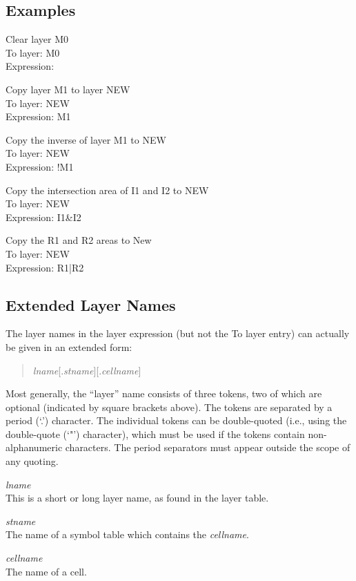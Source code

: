\subsection{Examples}

\begin{description}
\item{Clear layer {\vt M0}}\\
{\cb To layer}: {\vt M0}\\
{\cb Expression}: {}
\item{Copy layer {\vt M1} to layer {\vt NEW}}\\
{\cb To layer}: {\vt NEW}\\
{\cb Expression}: {\vt M1}
\item{Copy the inverse of layer {\vt M1} to {\vt NEW}}\\
{\cb To layer}: {\vt NEW}\\
{\cb Expression}: {\vt !M1}
\item{Copy the intersection area of {\vt I1} and {\vt I2} to {\vt NEW}}\\
{\cb To layer}: {\vt NEW}\\
{\cb Expression}: {\vt I1\&I2}
\item{Copy the {\vt R1} and {\vt R2} areas to {\vt New}}\\
{\cb To layer}: {\vt NEW}\\
{\cb Expression}: {\vt R1|R2}
\end{description}

\subsection{Extended Layer Names}

The layer names in the layer expression (but not the {\cb To layer}
entry) can actually be given in an extended form:

\begin{quote}
{\it lname\/}[{\vt .}{\it stname\/}][{\vt .}{\it cellname\/}]
\end{quote}

Most generally, the ``layer'' name consists of three tokens, two of
which are optional (indicated by square brackets above).  The tokens
are separated by a period (`{\vt .}') character.  The individual
tokens can be double-quoted (i.e., using the double-quote (`{\vt "}')
character), which must be used if the tokens contain non-alphanumeric
characters.  The period separators must appear outside the scope of
any quoting.

\begin{description}
\item{\it lname}\\
This is a short or long layer name, as found in the layer table.
\item{\it stname}\\
The name of a symbol table which contains the {\it cellname\/}.
\item{\it cellname}\\
The name of a cell.
\end{description}

